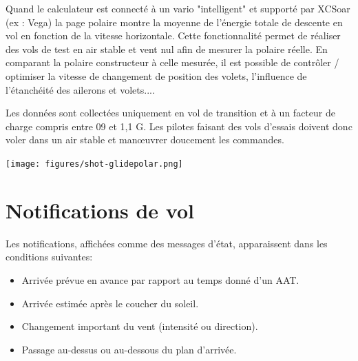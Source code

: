 Quand le calculateur est connecté à un vario "intelligent" et supporté par XCSoar (ex : Vega) la page polaire montre la moyenne de l'énergie totale de descente en vol en fonction de la vitesse horizontale. Cette fonctionnalité permet de réaliser des vols de test en air stable et vent nul afin de mesurer la polaire réelle. En comparant la polaire constructeur à celle mesurée, il est possible de contrôler / optimiser la vitesse de changement de position des volets, l'influence de l'étanchéité des ailerons et volets....  

Les données sont collectées uniquement en vol de transition et à un facteur de charge compris entre 09 et 1,1 G. Les pilotes faisant des vols d'essais doivent donc voler dans un air stable et manœuvrer doucement les commandes. 
\begin{center}
\texttt{[image: figures/shot-glidepolar.png]}
\end{center}

\section{Notifications de vol}

Les notifications, affichées comme des messages d'état, apparaissent dans les conditions suivantes:
\begin{itemize}
\item Arrivée prévue en avance par rapport au temps donné d'un AAT.
\item Arrivée estimée après le coucher du soleil.
\item Changement important du vent (intensité ou direction).
\item Passage au-dessus ou au-dessous du plan d'arrivée.
\end{itemize}
